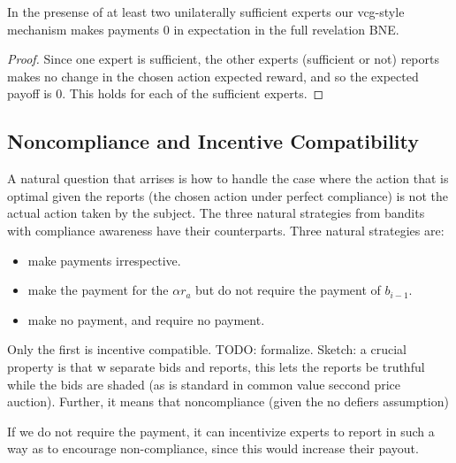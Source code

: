 \begin{lem}
	In the presense of at least two unilaterally sufficient experts our vcg-style mechanism makes payments 0 in expectation in the full revelation BNE. 
\end{lem}

\begin{proof}
    Since one expert is sufficient, the other experts (sufficient or not) reports makes no change in the chosen action expected reward, and so the expected payoff is 0. This holds for each of the sufficient experts.
\end{proof}






\subsection{Noncompliance and Incentive Compatibility}

A natural question that arrises is how to handle the case where the action that is optimal given the reports (the chosen action under perfect compliance) is not the actual action taken by the subject. The three natural strategies from bandits with compliance awareness have their counterparts. Three natural strategies are:

\begin{itemize}
\item make payments irrespective. 
\item make the payment for the $\alpha r_a$ but do not require the payment of $b_{i-1}$.
\item make no payment, and require no payment.
\end{itemize}

Only the first is incentive compatible. TODO: formalize. Sketch: a crucial property is that w separate bids and reports, this lets the reports be truthful while the bids are shaded (as is standard in common value seccond price auction). Further, it means that noncompliance (given the no defiers assumption) 


If we do not require the payment, it can incentivize experts to report in such a way as to encourage non-compliance, since this would increase their payout. 


